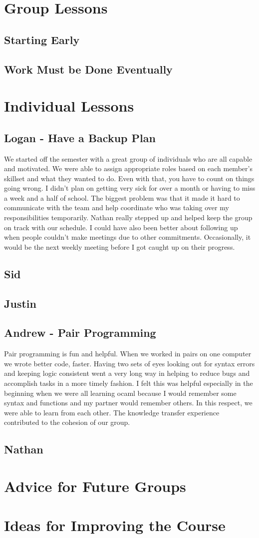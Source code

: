 \section{Group Lessons}
\subsection{Starting Early}
\subsection{Work Must be Done Eventually}

\section{Individual Lessons}
\subsection{Logan - Have a Backup Plan}
We started off the semester with a great group of individuals who are all capable and motivated. We were able to assign appropriate roles based on each member's skillset and what they wanted to do. Even with that, you have to count on things going wrong. I didn’t plan on getting very sick for over a month or having to miss a week and a half of school. The biggest problem was that it made it hard to communicate with the team and help coordinate who was taking over my responsibilities temporarily. Nathan really stepped up and helped keep the group on track with our schedule. I could have also been better about following up when people couldn’t make meetings due to other commitments. Occasionally, it would be the next weekly meeting before I got caught up on their progress. 

\subsection{Sid}
\subsection{Justin}
\subsection{Andrew - Pair Programming}
Pair programming is fun and helpful. When we worked in pairs on one computer we wrote better code, faster. Having two sets of eyes looking out for syntax errors and keeping logic consistent went a very long way in helping to reduce bugs and accomplish tasks in a more timely fashion. I felt this was helpful especially in the beginning when we were all learning ocaml because I would remember some syntax and functions and my partner would remember others. In this respect, we were able to learn from each other. The knowledge transfer experience contributed to the cohesion of our group.

\subsection{Nathan}

\section{Advice for Future Groups}

\section{Ideas for Improving the Course}
